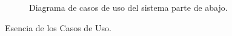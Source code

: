 \begin{figure}[htbp]
	\begin{center}
		\caption{Diagrama de casos de uso del sistema parte de abajo.}
		\label{fig:casosDeUso}
	\end{center}
\end{figure}
Esencia de los Casos de Uso.




